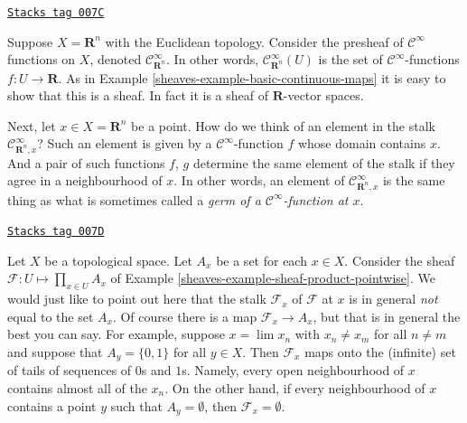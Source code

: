 \begin{example}
\label{sheaves-example-germs-functions}
\href{https://stacks.math.columbia.edu/tag/007C}{\texttt{Stacks tag 007C}}

Suppose $X = \mathbf{R}^n$ with the Euclidean topology.
Consider the presheaf of $\mathcal{C}^\infty$ functions
on $X$, denoted $\mathcal{C}^\infty_{\mathbf{R}^n}$.
In other words, $\mathcal{C}^\infty_{\mathbf{R}^n}(U)$ is the set
of $\mathcal{C}^\infty$-functions $f : U \to \mathbf{R}$.
As in Example \ref{sheaves-example-basic-continuous-maps}
it is easy to show that this is a sheaf. In fact it
is a sheaf of $\mathbf{R}$-vector spaces.

\medskip\noindent
Next, let $x \in X = \mathbf{R}^n$ be a point. How do
we think of an element in the stalk $\mathcal{C}^\infty_{\mathbf{R}^n, x}$?
Such an element is given by a $\mathcal{C}^\infty$-function
$f$ whose domain contains $x$. And a pair of such
functions $f$, $g$ determine
the same element of the stalk if they agree in a neighbourhood
of $x$. In other words, an element of $\mathcal{C}^\infty_{\mathbf{R}^n, x}$
is the same thing as what is sometimes called
a {\it germ of a $\mathcal{C}^\infty$-function at $x$}.
\end{example}

\begin{example}
\label{sheaves-example-sheaf-product-pointwise-stalk}
\href{https://stacks.math.columbia.edu/tag/007D}{\texttt{Stacks tag 007D}}

Let $X$ be a topological space. Let $A_x$ be a set for each $x \in X$.
Consider the sheaf $\mathcal{F} : U \mapsto \prod_{x\in U} A_x$ of Example
\ref{sheaves-example-sheaf-product-pointwise}. We would just like to point
out here that the stalk $\mathcal{F}_x$ of $\mathcal{F}$ at $x$
is in general {\it not} equal to the set $A_x$. Of course there is
a map $\mathcal{F}_x \to A_x$, but that is in general the best you
can say. For example, suppose $x = \lim x_n$ with $x_n \not = x_m$ for
all $n \not = m$ and suppose that $A_y = \{0, 1\}$ for all $y \in X$. Then
$\mathcal{F}_x$ maps onto the (infinite) set of tails of sequences
of $0$s and $1$s. Namely, every open neighbourhood of $x$ contains almost
all of the $x_n$. On the other hand, if every neighbourhood of $x$ contains
a point $y$ such that $A_y = \emptyset$, then $\mathcal{F}_x = \emptyset$.
\end{example}

